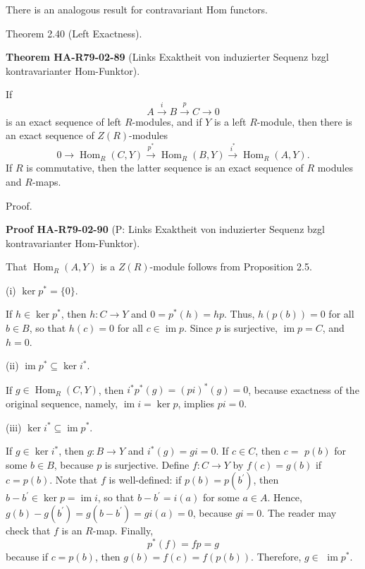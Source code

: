 \documentclass[10pt, letterpaper]{article}
\newcommand{\CustomHeading}[3]{%
  \par\medskip\noindent%
  \textbf{#1 #2} \textnormal{(#3)}.\enskip%
}
\newenvironment{THEO}[2]{\begin{unitbox}\CustomHeading{Theorem}{#1}{#2}}{\end{unitbox}}
\newenvironment{PROOF}[2]{\begin{unitbox}\CustomHeading{Proof}{#1}{#2}}{\end{unitbox}}
\begin{document}
There is an analogous result for contravariant Hom functors.



Theorem 2.40 (Left Exactness). 

\begin{THEO}{HA-R79-02-89}{Links Exaktheit von induzierter Sequenz bzgl kontravarianter Hom-Funktor}
If
$$
A \xrightarrow{i} B \xrightarrow{p} C \rightarrow 0
$$
is an exact sequence of left $R$-modules, and if $Y$ is a left $R$-module, then there is an exact sequence of $Z(R)$-modules
$$
0 \rightarrow \operatorname{Hom}_{R}(C, Y) \xrightarrow{p^{*}} \operatorname{Hom}_{R}(B, Y) \xrightarrow{i^{*}} \operatorname{Hom}_{R}(A, Y) .
$$
If $R$ is commutative, then the latter sequence is an exact sequence of $R$ modules and $R$-maps.
\end{THEO}



Proof. 


\begin{PROOF}{HA-R79-02-90}{P: Links Exaktheit von induzierter Sequenz bzgl kontravarianter Hom-Funktor}
That $\operatorname{Hom}_{R}(A, Y)$ is a $Z(R)$-module follows from Proposition 2.5.

(i) $\operatorname{ker} p^{*}=\{0\}$.

If $h \in \operatorname{ker} p^{*}$, then $h: C \rightarrow Y$ and $0=p^{*}(h)=h p$. Thus, $h(p(b))=0$ for all $b \in B$, so that $h(c)=0$ for all $c \in \operatorname{im} p$. Since $p$ is surjective, $\operatorname{im} p=C$, and $h=0$.

(ii) $\operatorname{im} p^{*} \subseteq \operatorname{ker} i^{*}$.

If $g \in \operatorname{Hom}_{R}(C, Y)$, then $i^{*} p^{*}(g)=(p i)^{*}(g)=0$, because exactness of the original sequence, namely, $\operatorname{im} i=\operatorname{ker} p$, implies $p i=0$.


(iii) $\operatorname{ker} i^{*} \subseteq \operatorname{im} p^{*}$.

If $g \in \operatorname{ker} i^{*}$, then $g: B \rightarrow Y$ and $i^{*}(g)=g i=0$. If $c \in C$, then $c=$ $p(b)$ for some $b \in B$, because $p$ is surjective. Define $f: C \rightarrow Y$ by $f(c)=g(b)$ if $c=p(b)$. Note that $f$ is well-defined: if $p(b)=p\left(b^{\prime}\right)$, then $b-b^{\prime} \in \operatorname{ker} p=\operatorname{im} i$, so that $b-b^{\prime}=i(a)$ for some $a \in A$. Hence, $g(b)-g\left(b^{\prime}\right)=g\left(b-b^{\prime}\right)=g i(a)=0$, because $g i=0$. The reader may check that $f$ is an $R$-map. Finally,
$$
p^{*}(f)=f p=g
$$
because if $c=p(b)$, then $g(b)=f(c)=f(p(b))$. Therefore, $g \in$ $\operatorname{im} p^{*}$.
\end{PROOF}
\end{document}
